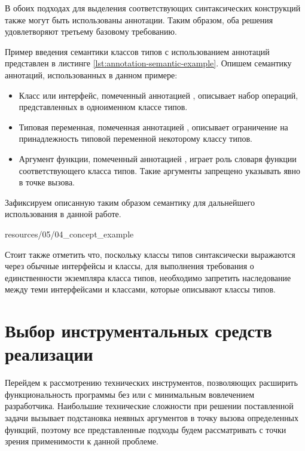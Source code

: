 В обоих подходах для выделения соответствующих синтаксических конструкций также могут быть использованы аннотации. Таким образом, оба решения удовлетворяют третьему базовому требованию.  

Пример введения семантики классов типов с использованием аннотаций представлен в листинге \ref{lst:annotation-semantic-example}. Опишем семантику аннотаций, использованных в данном примере:
\begin{itemize}
    \item Класс или интерфейс, помеченный аннотацией , описывает набор операций, представленных в одноименном классе типов.
    \item Типовая переменная, помеченная аннотацией , описывает ограничение на принадлежность типовой переменной некоторому классу типов.
    \item Аргумент функции, помеченный аннотацией , играет роль словаря функции соответствующего класса типов. Такие аргументы запрещено указывать явно в точке вызова. 
\end{itemize}
Зафиксируем описанную таким образом семантику для дальнейшего использования в данной работе. 


{resources/05/04_concept_example}

Стоит также отметить что, поскольку классы типов синтаксически выражаются через обычные интерфейсы и классы, для выполнения требования о единственности экземпляра класса типов, необходимо запретить наследование между теми интерфейсами и классами, которые описывают классы типов. 

\section{Выбор инструментальных средств реализации}

Перейдем к рассмотрению технических инструментов, позволяющих расширить функциональность программы без или с минимальным вовлечением разработчика. Наибольшие технические сложности при решении поставленной задачи вызывает подстановка неявных аргументов в точку вызова определенных функций, поэтому все представленные подходы будем рассматривать с точки зрения применимости к данной проблеме.

